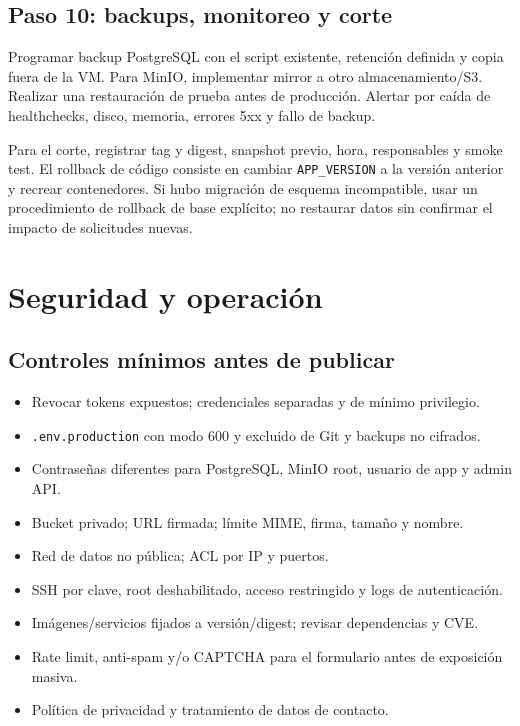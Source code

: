 \documentclass[11pt,a4paper]{article}
\newcommand{\code}[1]{\nolinkurl{#1}}
\begin{document}
\subsection{Paso 10: backups, monitoreo y corte}

Programar backup PostgreSQL con el script existente, retención definida y copia fuera de la VM. Para MinIO, implementar mirror a otro almacenamiento/S3. Realizar una restauración de prueba antes de producción. Alertar por caída de healthchecks, disco, memoria, errores 5xx y fallo de backup.

Para el corte, registrar tag y digest, snapshot previo, hora, responsables y smoke test. El rollback de código consiste en cambiar \code{APP_VERSION} a la versión anterior y recrear contenedores. Si hubo migración de esquema incompatible, usar un procedimiento de rollback de base explícito; no restaurar datos sin confirmar el impacto de solicitudes nuevas.

\section{Seguridad y operación}

\subsection{Controles mínimos antes de publicar}

\begin{itemize}
  \item Revocar tokens expuestos; credenciales separadas y de mínimo privilegio.
  \item \code{.env.production} con modo 600 y excluido de Git y backups no cifrados.
  \item Contraseñas diferentes para PostgreSQL, MinIO root, usuario de app y admin API.
  \item Bucket privado; URL firmada; límite MIME, firma, tamaño y nombre.
  \item Red de datos no pública; ACL por IP y puertos.
  \item SSH por clave, root deshabilitado, acceso restringido y logs de autenticación.
  \item Imágenes/servicios fijados a versión/digest; revisar dependencias y CVE.
  \item Rate limit, anti-spam y/o CAPTCHA para el formulario antes de exposición masiva.
  \item Política de privacidad y tratamiento de datos de contacto.
\end{itemize}
\end{document}
